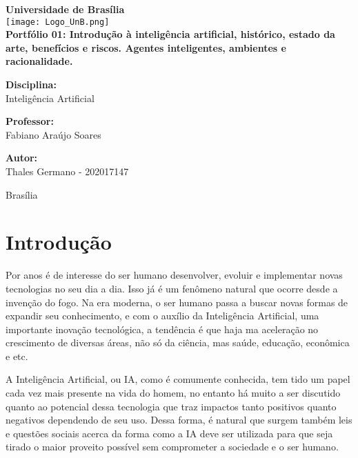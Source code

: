 \documentclass[a4paper,12pt]{article}
\begin{document}
\begin{titlepage}
\begin{center}
\textbf{\LARGE Universidade de Brasília}\\[0.5cm] 
\vspace{20pt}
\texttt{[image: Logo\_UnB.png]}\\[1cm]

\vspace{32pt}
\textbf{\LARGE Portfólio 01: Introdução à inteligência artificial, histórico, estado da arte, benefícios e riscos. Agentes inteligentes, ambientes e racionalidade.}\\
\vspace{30pt}

\textbf{\Large Disciplina:}\\[0.2cm]
\large{Inteligência Artificial}\\[0.1cm]
\vspace{30pt}

\textbf{\Large Professor:}\\[0.2cm]
\large{Fabiano Araújo Soares}\\[0.1cm]
\vspace{30pt}

\textbf{\Large Autor:}\\[0.2cm]
\large{Thales Germano - 202017147}\\[0.1cm]
\end{center}

\vfill
\begin{center}
{\normalsize Brasília}\\
\end{center}
\end{titlepage}

\newpage

\section{Introdução}
Por anos é de interesse do ser humano desenvolver, evoluir e implementar novas tecnologias no seu dia a dia. Isso já é um fenômeno natural que ocorre desde a invenção do fogo. Na era moderna, o ser humano passa a buscar novas formas de expandir seu conhecimento, e com o auxílio da Inteligência Artificial, uma importante inovação tecnológica, a tendência é que haja ma aceleração no crescimento de diversas áreas, não só da ciência, mas saúde, educação, econômica e etc.

A Inteligência Artificial, ou IA, como é comumente conhecida, tem tido um papel cada vez mais presente na vida do homem, no entanto há muito a ser discutido quanto ao potencial dessa tecnologia que traz impactos tanto positivos quanto negativos dependendo de seu uso. Dessa forma, é natural que surgem também leis e questões sociais acerca da forma como a IA deve ser utilizada para que seja tirado o maior proveito possível sem comprometer a sociedade e o ser humano.
\end{document}
